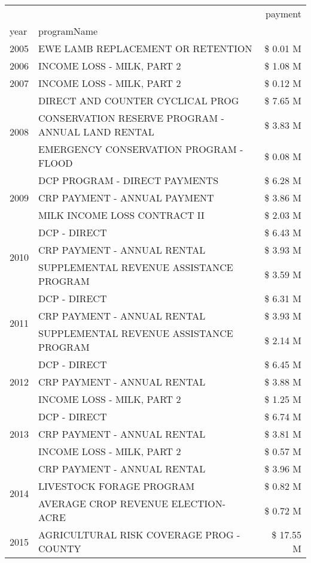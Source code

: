 \begin{tabular}{llr}
\toprule
 &  & payment \\
year & programName &  \\
\midrule
2005 & EWE LAMB REPLACEMENT OR RETENTION & \$ 0.01 M \\
\cline{1-3}
2006 & INCOME LOSS - MILK, PART 2 & \$ 1.08 M \\
\cline{1-3}
2007 & INCOME LOSS - MILK, PART 2 & \$ 0.12 M \\
\cline{1-3}
\multirow[t]{3}{*}{2008} & DIRECT AND COUNTER CYCLICAL PROG & \$ 7.65 M \\
 & CONSERVATION RESERVE PROGRAM - ANNUAL LAND RENTAL & \$ 3.83 M \\
 & EMERGENCY CONSERVATION PROGRAM - FLOOD & \$ 0.08 M \\
\cline{1-3}
\multirow[t]{3}{*}{2009} & DCP PROGRAM - DIRECT PAYMENTS & \$ 6.28 M \\
 & CRP PAYMENT - ANNUAL PAYMENT & \$ 3.86 M \\
 & MILK INCOME LOSS CONTRACT II & \$ 2.03 M \\
\cline{1-3}
\multirow[t]{3}{*}{2010} & DCP - DIRECT & \$ 6.43 M \\
 & CRP PAYMENT - ANNUAL RENTAL & \$ 3.93 M \\
 & SUPPLEMENTAL REVENUE ASSISTANCE PROGRAM & \$ 3.59 M \\
\cline{1-3}
\multirow[t]{3}{*}{2011} & DCP - DIRECT & \$ 6.31 M \\
 & CRP PAYMENT - ANNUAL RENTAL & \$ 3.93 M \\
 & SUPPLEMENTAL REVENUE ASSISTANCE PROGRAM & \$ 2.14 M \\
\cline{1-3}
\multirow[t]{3}{*}{2012} & DCP - DIRECT & \$ 6.45 M \\
 & CRP PAYMENT - ANNUAL RENTAL & \$ 3.88 M \\
 & INCOME LOSS - MILK, PART 2 & \$ 1.25 M \\
\cline{1-3}
\multirow[t]{3}{*}{2013} & DCP - DIRECT & \$ 6.74 M \\
 & CRP PAYMENT - ANNUAL RENTAL & \$ 3.81 M \\
 & INCOME LOSS - MILK, PART 2 & \$ 0.57 M \\
\cline{1-3}
\multirow[t]{3}{*}{2014} & CRP PAYMENT - ANNUAL RENTAL & \$ 3.96 M \\
 & LIVESTOCK FORAGE PROGRAM & \$ 0.82 M \\
 & AVERAGE CROP REVENUE ELECTION-ACRE & \$ 0.72 M \\
\cline{1-3}
\multirow[t]{3}{*}{2015} & AGRICULTURAL RISK COVERAGE PROG - COUNTY & \$ 17.55 M \\

\end{tabular}
